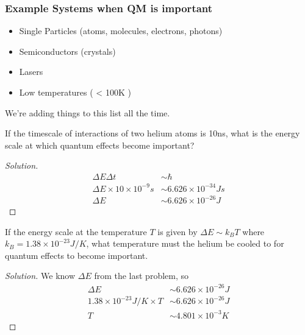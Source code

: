 \subsubsection*{Example Systems when QM is important}

\begin{itemize}
	\item Single Particles (atoms, molecules, electrons, photons)
	\item Semiconductors (crystals)
	\item Lasers
	\item Low temperatures ( < 100K )
\end{itemize}

We're adding things to this list all the time.

\pagebreak

\begin{prblm}
	If the timescale of interactions of two helium atoms is 10ns, 
	what is the energy scale at which quantum effects become important?
	\begin{proof}[Solution]
		\begin{align*}
			\Delta E \Delta t & \sim \hbar \\
			\Delta E \times 10 \times 10^{-9} s & \sim 6.626 \times 10^{-34} J s \\
			\Delta E & \sim 6.626 \times 10^{-26} J 
		\end{align*}
	\end{proof}
\end{prblm}

\begin{prblm}
	If the energy scale at the temperature $T$ is given by $\Delta E \sim k_B T$ 
	where $k_B = 1.38 \times 10^{-23} J / K$, what temperature must the helium be cooled to
	for quantum effects to become important.
	\begin{proof}[Solution]
		We know $\Delta E$ from the last problem, so 
		\begin{align*}
			\Delta E & \sim 6.626 \times 10^{-26} J \\
			1.38 \times 10^{-23} J/K \times T & \sim 6.626 \times 10^{-26} J \\ 
			T & \sim 4.801 \times 10^{-3} K
		\end{align*}
	\end{proof}
\end{prblm}